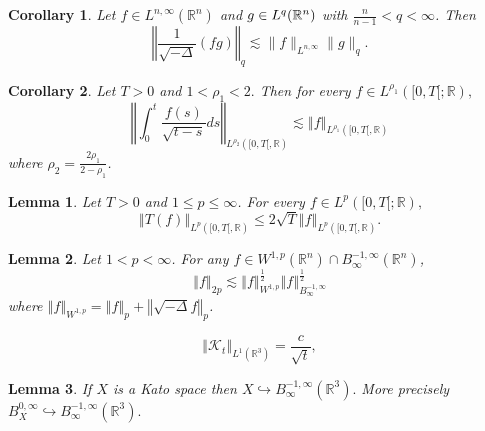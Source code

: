 \documentclass[10pt,a4paper]{amsart}
\newtheorem{lemma}{Lemma}
\newtheorem{corollary}{Corollary}
\begin{document}
\begin{corollary}\label{Mon}
Let $f\in L^{n,\infty }(\mathbb{R}^{n})$ and $g\in L^{q}(\mathbb{%
R}^{n})$  with $\frac{n}{n-1}<q<\infty$. Then%
\[
\left\Vert \frac{1}{\sqrt{-\Delta }}(fg)\right\Vert _{q}\lesssim \|f\|_{L^{n,\infty}} \|g\|_{q}.
\]
\end{corollary}

\begin{corollary} \label{cor2}
Let $T>0$ and $ 1<\rho _{1}<2.$ Then for every $f\in L^{\rho _{1}}([0,T[;%
\mathbb{R}),$
\[
\left\Vert \int_{0}^{t}\frac{f(s)}{\sqrt{t-s}}ds\right\Vert _{L^{\rho
_{2}}([0,T[,\mathbb{R})}\lesssim \left\Vert f\right\Vert _{L^{\rho _{1}}([0,T[,%
\mathbb{R})}
\]%
where $\rho _{2}=\frac{2\rho _{1}}{2-\rho _{1}}$.
\end{corollary}

\begin{lemma}\label{con}
Let $T>0$ and $1\leq p\leq\infty$. For every $f\in L^{p}([0,T[;%
\mathbb{R}),$
$$ \left\Vert T(f)\right\Vert_{L^{p}([0,T[,\mathbb{R})}\leq 2\sqrt{T}\left\Vert f\right\Vert_{L^{p}([0,T[,\mathbb{R})}.$$
\end{lemma}

\begin{lemma}\label{GMO}
Let $1<p<\infty$. For any $f\in W^{1,p}(\mathbb{R}^n)\cap B^{-1,\infty}_\infty(\mathbb{R}^n)$,
$$\left\Vert f\right\Vert_{2p}\lesssim \left\Vert f\right\Vert_{W^{1,p}}^{\frac{1}{2}}\left\Vert f\right\Vert_{B^{-1,\infty}_\infty }^{\frac{1}{2}} $$
where $\left\Vert f\right\Vert_{W^{1,p}}=\left\Vert f\right\Vert_p +\left\Vert\sqrt{-\Delta} f\right\Vert_p$.
\end{lemma}

        \begin{equation}\label{kernel}
            \left\Vert \mathcal{K}_t\right\Vert_{ L^1(\mathbb{R}^3)}=\frac{c}{\sqrt{t}},
        \end{equation}

\begin{lemma}\label{Linj}
If $X$ is a Kato space then $X\hookrightarrow B_{\infty }^{-1,\infty }(%
\mathbb{R}^{3}).$ More precisely $B^{0,\infty}_X\hookrightarrow B_{\infty }^{-1,\infty }(%
\mathbb{R}^{3}).$
\end{lemma}
\end{document}
